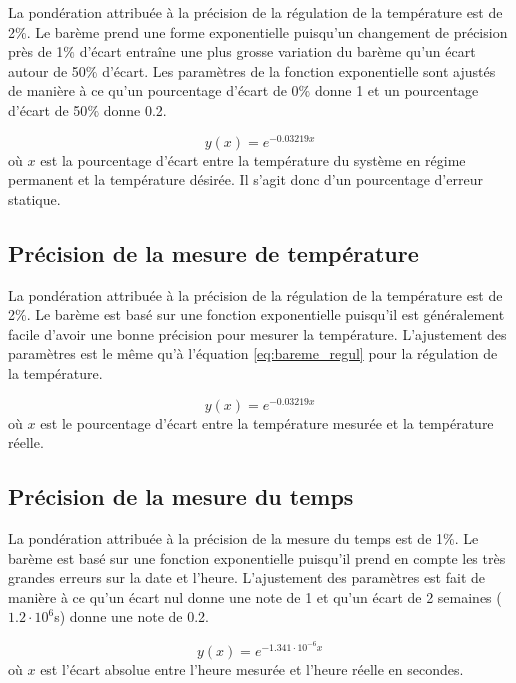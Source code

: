 La pondération attribuée à la précision de la régulation de la température est de 2$\%$. Le barème prend une forme exponentielle puisqu'un changement de précision près de 1$\%$ d'écart entraîne une plus grosse variation du barème qu'un écart autour de 50$\%$ d'écart. Les paramètres de la fonction exponentielle sont ajustés de manière à ce qu'un pourcentage d'écart de 0$\%$ donne 1 et un pourcentage d'écart de 50$\%$ donne 0.2.

\begin{equation}
    y(x) = e^{-0.03219x}
    \label{eq:bareme_regul}
\end{equation}
où $x$ est la pourcentage d'écart entre la température du système en régime permanent et la température désirée. Il s'agit donc d'un pourcentage d'erreur statique.

\subsection{Précision de la mesure de température}
\label{Pdlmdt}

La pondération attribuée à la précision de la régulation de la température est de 2$\%$. Le barème est basé sur une fonction exponentielle puisqu'il est généralement facile d'avoir une bonne précision pour mesurer la température. L'ajustement des paramètres est le même qu'à l'équation \ref{eq:bareme_regul} pour la régulation de la température.

\begin{equation}
    y(x) = e^{-0.03219x}
    \label{eq:bareme_precision_temperature}
\end{equation}
où $x$ est le pourcentage d'écart entre la température mesurée et la température réelle.

\subsection{Précision de la mesure du temps}
\label{Pdlmdtasd}

La pondération attribuée à la précision de la mesure du temps est de 1$\%$. Le barème est basé sur une fonction exponentielle puisqu'il prend en compte les très grandes erreurs sur la date et l'heure. L'ajustement des paramètres est fait de manière à ce qu'un écart nul donne une note de 1 et qu'un écart de 2 semaines ($1.2\cdot 10^6$s) donne une note de 0.2.

\begin{equation}
    y(x) = e^{-1.341\cdot10^{-6}x}
    \label{eq:bareme_precision_temps}
\end{equation}
où $x$ est l'écart absolue entre l'heure mesurée et l'heure réelle en secondes.

